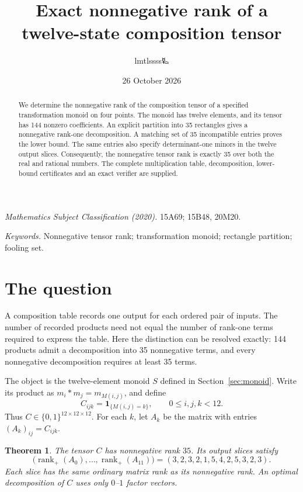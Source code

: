 \documentclass[11pt,a4paper]{article}
\title{\LARGE Exact nonnegative rank of a\protect\\twelve-state composition tensor}
\author{lmtlssss{\authorsymbol 🜐}}
\date{26 October 2026}
\newtheorem{theorem}{Theorem}
\theoremstyle{definition}
\DeclareMathOperator{\rank}{rank}
\newcommand{\ind}{\mathbf 1}
\begin{document}
\maketitle
\thispagestyle{plain}
\begin{abstract}
We determine the nonnegative rank of the composition tensor of a specified
transformation monoid on four points. The monoid has twelve elements, and
its tensor has 144 nonzero coefficients. An explicit partition into 35
rectangles gives a nonnegative rank-one decomposition. A matching set of
35 incompatible entries proves the lower bound. The same entries also
specify determinant-one minors in the twelve output slices. Consequently,
the nonnegative tensor rank is exactly 35 over both the real and rational
numbers. The complete multiplication table, decomposition, lower-bound
certificates and an exact verifier are supplied.
\end{abstract}

\noindent\textit{Mathematics Subject Classification (2020).}
15A69; 15B48, 20M20.\par
\noindent\textit{Keywords.} Nonnegative tensor rank; transformation monoid;
rectangle partition; fooling set.

\section{The question}

A composition table records one output for each ordered pair of inputs.
The number of recorded products need not equal the number of rank-one
terms required to express the table. Here the distinction can be resolved
exactly: 144 products admit a decomposition into 35 nonnegative terms,
and every nonnegative decomposition requires at least 35 terms.

The object is the twelve-element monoid $S$ defined in Section~\ref{sec:monoid}.
Write its product as $m_i*m_j=m_{M(i,j)}$, and define
\begin{equation}\label{eq:tensor}
 C_{ijk}=\ind_{\{M(i,j)=k\}},\qquad 0\leq i,j,k<12.
\end{equation}
Thus $C\in\{0,1\}^{12\times12\times12}$. For each $k$, let $A_k$ be the
matrix with entries $(A_k)_{ij}=C_{ijk}$.

\begin{theorem}\label{thm:main}
The tensor $C$ has nonnegative rank $35$. Its output slices satisfy
\begin{equation}\label{eq:ranks}
\bigl(\rank_+(A_0),\ldots,\rank_+(A_{11})\bigr)
=(3,2,3,2,1,5,4,2,5,3,2,3).
\end{equation}
Each slice has the same ordinary matrix rank as its nonnegative rank.
An optimal decomposition of $C$ uses only $0$--$1$ factor vectors.
\end{theorem}
\end{document}
